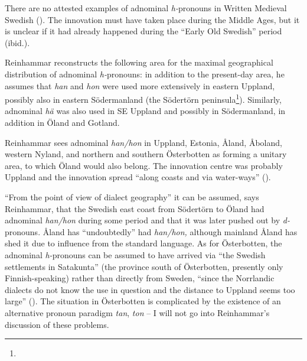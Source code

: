\begin{styleBodytextC}
There are no attested examples of adnominal \textit{h-}pronouns in Written Medieval Swedish (\citet[114]{Reinhammar1975}). The innovation must have taken place during the Middle Ages, but it is unclear if it had already happened during the “Early Old Swedish” period (ibid.).

\end{styleBodytextC}

\begin{styleBodytextC}
Reinhammar reconstructs the following area for the maximal geographical distribution of adnominal \textit{h-}pronouns: in addition to the present-day area, he assumes that \textit{han} and \textit{hon} were used more extensively in eastern Uppland, possibly also in eastern Södermanland (the Södertörn peninsula\footnote{}). Similarly, adnominal \textit{hä }was also used in SE Uppland and possibly in Södermanland, in addition in Öland and Gotland. 

\end{styleBodytextC}

\begin{styleBodytextC}
Reinhammar sees adnominal \textit{han/hon }in Uppland, Estonia, Åland, Åboland, western Nyland, and northern and southern Österbotten as forming a unitary area, to which Öland would also belong. The innovation centre was probably Uppland and the innovation spread “along coasts and via water-ways” (\citet[115]{Reinhammar1975}).

\end{styleBodytextC}

\begin{styleBodytextC}
“From the point of view of dialect geography” it can be assumed, says Reinhammar, that the Swedish east coast from Södertörn to Öland had adnominal \textit{han/hon} during some period and that it was later pushed out by \textit{d-}pronouns. Åland has “undoubtedly” had \textit{han/hon, }although mainland Åland has shed it due to influence from the standard language. As for Österbotten, the adnominal \textit{h-}pronouns can be assumed to have arrived via “the Swedish settlements in Satakunta” (the province south of Österbotten, presently only Finnish-speaking) rather than directly from Sweden, “since the Norrlandic dialects do not know the use in question and the distance to Uppland seems too large” (\citet[116]{Reinhammar1975}). The situation in Österbotten is complicated by the existence of an alternative pronoun paradigm \textit{tan}, \textit{ton} – I will not go into Reinhammar’s discussion of these problems. 

\end{styleBodytextC}

